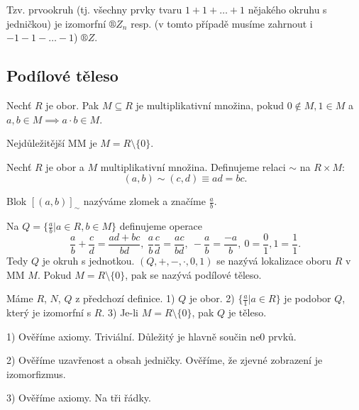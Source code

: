 \documentclass[12pt]{article}                   %
\begin{document}
        \begin{priklady}
            Tzv. prvookruh (tj. všechny prvky tvaru $1+1+…+1$ nějakého okruhu s jedničkou) je izomorfní $®Z_n$ resp. (v tomto případě musíme zahrnout i $-1-1-…-1$) $®Z$.
        \end{priklady}

    \subsection{Podílové těleso}
        \begin{definice}
            Nechť $R$ je obor. Pak $M \subseteq R$ je multiplikativní množina, pokud $0 \notin M, 1 \in M$ a $a, b \in M \implies a·b \in M$.

            \begin{prikladyin}
                Nejdůležitější MM je $M = R \setminus \{0\}$.
            \end{prikladyin}
        \end{definice}

        \begin{definice}
            Nechť $R$ je obor a $M$ multiplikativní množina. Definujeme relaci $\sim$ na $R \times M$:
            $$ (a, b) \sim (c, d) ≡ ad = bc. $$

            Blok $[(a, b)]_{\sim}$ nazýváme zlomek a značíme $\frac{a}{b}$.

            Na $Q = \{\frac{a}{b} | a \in R, b \in M\}$ definujeme operace
            $$ \frac{a}{b} + \frac{c}{d} = \frac{ad + bc}{bd},\ \frac{a}{b}\frac{c}{d} = \frac{ac}{bd},\ -\frac{a}{b} = \frac{-a}{b},\ 0 = \frac{0}{1}, 1 = \frac{1}{1}. $$ 
            Tedy $Q$ je okruh s jednotkou. $(Q, +, -, ·, 0, 1)$ se nazývá lokalizace oboru $R$ v MM $M$. Pokud $M = R \setminus \{0\}$, pak se nazývá podílové těleso.
        \end{definice}

        
        \begin{tvrzeni}
            Máme $R$, $N$, $Q$ z předchozí definice. 1) $Q$ je obor. 2) $\{\frac{a}{1} | a \in R\}$ je podobor $Q$, který je izomorfní s $R$. 3) Je-li $M = R \setminus \{0\}$, pak $Q$ je těleso.

            \begin{dukazin}
                1) Ověříme axiomy. Triviální. Důležitý je hlavně součin ne0 prvků.

                2) Ověříme uzavřenost a obsah jedničky. Ověříme, že zjevné zobrazení je izomorfizmus.

                3) Ověříme axiomy. Na tři řádky.
            \end{dukazin}
        \end{tvrzeni}
\end{document}
